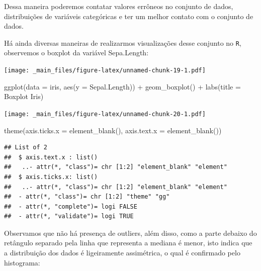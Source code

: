 \documentclass[
]{book}
\newenvironment{Shaded}{\begin{snugshade}}{\end{snugshade}}
\newcommand{\AttributeTok}[1]{\textcolor[rgb]{0.77,0.63,0.00}{#1}}
\newcommand{\FunctionTok}[1]{\textcolor[rgb]{0.00,0.00,0.00}{#1}}
\newcommand{\NormalTok}[1]{#1}
\newcommand{\SpecialCharTok}[1]{\textcolor[rgb]{0.00,0.00,0.00}{#1}}
\newcommand{\StringTok}[1]{\textcolor[rgb]{0.31,0.60,0.02}{#1}}
\begin{document}
Dessa maneira poderemos contatar valores errôneos no conjunto de dados, distribuições de variáveis categóricas e ter um melhor contato com o conjunto de dados.

Há ainda diversas maneiras de realizarmos visualizações desse conjunto no \texttt{R}, observemos o boxplot da variável Sepa.Length:

\begin{Shaded}
\end{Shaded}

\texttt{[image: \_main\_files/figure-latex/unnamed-chunk-19-1.pdf]}

\begin{Shaded}
\begin{Highlighting}[]
\FunctionTok{ggplot}\NormalTok{(}\AttributeTok{data =}\NormalTok{ iris, }\FunctionTok{aes}\NormalTok{(}\AttributeTok{y =}\NormalTok{ Sepal.Length)) }\SpecialCharTok{+}
  \FunctionTok{geom\_boxplot}\NormalTok{() }\SpecialCharTok{+}
  \FunctionTok{labs}\NormalTok{(}\AttributeTok{title =} \StringTok{\textquotesingle{}Boxplot Iris\textquotesingle{}}\NormalTok{)}
\end{Highlighting}
\end{Shaded}

\texttt{[image: \_main\_files/figure-latex/unnamed-chunk-20-1.pdf]}

\begin{Shaded}
\begin{Highlighting}[]
  \FunctionTok{theme}\NormalTok{(}\AttributeTok{axis.ticks.x =} \FunctionTok{element\_blank}\NormalTok{(),}
  \AttributeTok{axis.text.x =} \FunctionTok{element\_blank}\NormalTok{())}
\end{Highlighting}
\end{Shaded}

\begin{verbatim}
## List of 2
##  $ axis.text.x : list()
##   ..- attr(*, "class")= chr [1:2] "element_blank" "element"
##  $ axis.ticks.x: list()
##   ..- attr(*, "class")= chr [1:2] "element_blank" "element"
##  - attr(*, "class")= chr [1:2] "theme" "gg"
##  - attr(*, "complete")= logi FALSE
##  - attr(*, "validate")= logi TRUE
\end{verbatim}

Observamos que não há presença de outliers, além disso, como a parte debaixo do retângulo separado pela linha que representa a mediana é menor, isto indica que a distribuição dos dados é ligeiramente assimétrica, o qual é confirmado pelo histograma:
\end{document}
